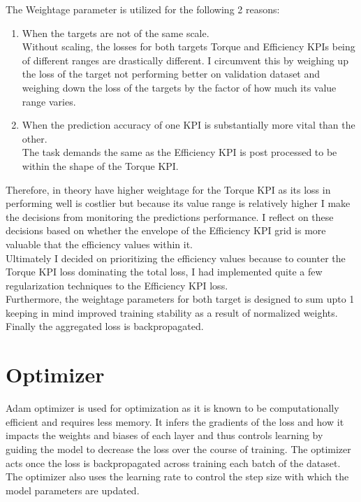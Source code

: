 \documentclass{report} %
\begin{document}
The Weightage parameter is utilized for the following 2 reasons:
\begin{enumerate}[nosep]
    \item  When the targets are not of the same scale. \\
    Without scaling, the losses for both targets Torque and Efficiency \ac{KPI}s being of different ranges are drastically different.
    I circumvent this by weighing up the loss of the target not performing better on validation dataset and weighing down the loss of the 
    targets by the factor of how much its value range varies.
    \item When the prediction accuracy of one \ac{KPI} is substantially more vital than the other. \\
    The task demands the same as the Efficiency \ac{KPI} is post processed to be within the shape of the Torque \ac{KPI}. \\

\end{enumerate}

Therefore, in theory have higher weightage for the Torque \ac{KPI} as its loss in performing well is costlier but because its value range is relatively higher I make the 
decisions from monitoring the predictions performance.
I reflect on these decisions based on whether the envelope of the Efficiency \ac{KPI} grid is more valuable that the efficiency values within it.\\
Ultimately I decided on prioritizing the efficiency values because to counter the Torque \ac{KPI} loss dominating the total loss, I had implemented 
quite a few regularization techniques to the Efficiency \ac{KPI} loss.\\
Furthermore, the weightage parameters for both target is designed to sum upto 1 keeping in mind improved training stability as a result of normalized weights. \\

Finally the aggregated loss is backpropagated.

\section{Optimizer}\label{sec:Optimizer}

Adam optimizer is used for optimization as it is known to be computationally efficient and requires less memory. 
It infers the gradients of the loss and how it impacts the weights and biases of each layer and thus controls learning by guiding the model to decrease the loss over the course of training. 
The optimizer acts once the loss is backpropagated across training each batch of the dataset.
The optimizer also uses the learning rate to control the step size with which the model parameters are updated.
\end{document}
